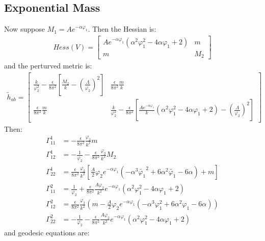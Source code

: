 \subsection{Exponential Mass}
Now suppose $M_{1} = A e^{-\alpha \varphi_{1}}$. Then the Hessian is:
\begin{align}
    Hess(V) = 
    \begin{bmatrix}
        Ae^{-\alpha \varphi_{1}}(\alpha^{2}\varphi_{1}^{2} - 4\alpha\varphi_{1} + 2) & m \\
        m & M_2
    \end{bmatrix}
\end{align}
and the perturved metric is:
\begin{align}
    \tilde h_{ab} = 
    \begin{bmatrix}
        \frac{k}{\varphi_{2}^{2}} -\frac{\epsilon}{8\pi^{2}}[\frac{M_{2}}{k} - (\frac{\Lambda}{\varphi_{2}})^{2}] & \frac{\epsilon}{8\pi^{2}}\frac{m}{k} \\
        \frac{\epsilon}{8\pi^{2}}\frac{m}{k} & \frac{k}{\varphi_{2}^{2}} -\frac{\epsilon}{8\pi^{2}} [\frac{Ae^{-\alpha\varphi_{1}}}{k}(\alpha^{2} \varphi_{1}^{2} - 4\alpha\varphi_{1} + 2) - (\frac{\Lambda}{\varphi_{2}})^{2}]
    \end{bmatrix}
\end{align}
Then:
\begin{align}
    \Gamma_{11}^{1} &= -\frac{\epsilon}{8\pi^{2}}\frac{\varphi_{2}}{k^{2}}m \\
    \Gamma_{12}^{1} &= -\frac{1}{\varphi_{2}} - \frac{\epsilon}{8\pi^{2}}\frac{\varphi_{2}}{k^{2}}M_{2} \\
    \Gamma_{22}^{1} &= \frac{\epsilon}{8\pi^{2}} \frac{\varphi_{2}}{k^{2}}[\frac{A}{2}\varphi_{2} e^{-\alpha\varphi_{1}} (-\alpha^{3}\tilde{\varphi_{1}}^{2} + 6\alpha^{2} \tilde{\varphi_{1}} - 6\alpha)+m]\\
    \Gamma_{11}^{2} &= \frac{1}{\varphi_{2}} + \frac{\epsilon}{8\pi^{2}}\frac{A\varphi_{2}}{k^{2}}e^{-\alpha\varphi_{1}}(\alpha^{2}\varphi_{1}^{2} - 4\alpha\varphi_{1} +2) \\
    \Gamma_{12}^{2} &= \frac{\epsilon}{8\pi^{2}} \frac{\varphi_{2}}{k^{2}}(m - \frac{A}{2} \varphi_{2} e^{-\alpha \varphi_{1}} (-\alpha^{3} \varphi_{1}^{2} + 6\alpha^{2} \varphi_{1} -6\alpha)) \\
    \Gamma_{22}^{2} &= -\frac{1}{\varphi_{2}} - \frac{\epsilon}{8\pi^{2}}\frac{A\varphi_{2}}{k^{2}}e^{-\alpha\varphi_{1}} (\alpha^{2} \varphi_{1}^{2} -4\alpha \varphi_{1} +2)
\end{align}
and geodesic equations are:
